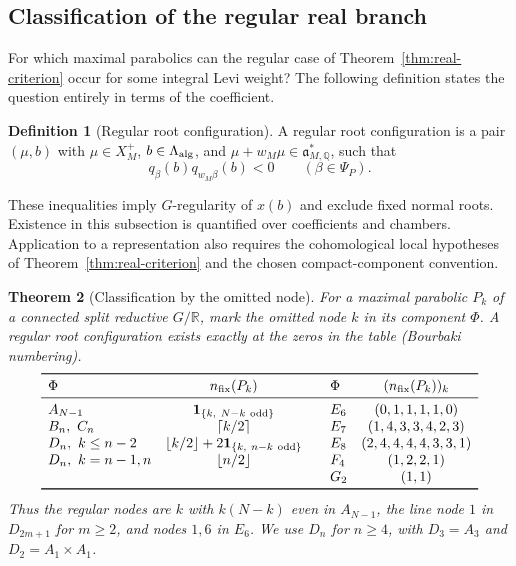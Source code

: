 \documentclass[12pt]{amsart}
\numberwithin{equation}{section}
\theoremstyle{plain}
\newtheorem{theorem}{Theorem}[section]
\theoremstyle{definition}
\newtheorem{definition}[theorem]{Definition}
\theoremstyle{remark}
\newcommand{\R}{\mathbb R}
\begin{document}
\subsection{Classification of the regular real branch} \label{sec:realclass-classification}
For which maximal parabolics can the regular case of Theorem~\ref{thm:real-criterion} occur for some integral Levi weight? The following definition states the question entirely in terms of the coefficient.
\begin{definition}[Regular root configuration] \label{def:regular-root-configuration}
A regular root configuration is a pair $(\mu,b)$ with $\mu\in X_M^+$, $b\in\Lambda_{\rm alg}$, and
$\mu+w_M\mu\in\mathfrak a_{M,\mathbb Q}^*$, such that 
\[
 q_\beta(b)q_{w_M\beta}(b)<0
 \qquad(\beta\in\Psi_P).
\]
\end{definition}
These inequalities imply $G$-regularity of $x(b)$ and exclude fixed normal roots. Existence in this subsection is quantified over coefficients and chambers. Application to a representation also requires the cohomological local hypotheses of Theorem~\ref{thm:real-criterion} and the chosen compact-component convention. 

\begin{theorem}[Classification by the omitted node] \label{thm:realclass-classification}
For a maximal parabolic $P_k$ of a connected split reductive $G/\R$, mark the omitted node $k$ in its component $\Phi$. A regular root configuration exists exactly at the zeros in the table (Bourbaki numbering). 
\[
\begin{array}{lc@{\qquad}lc}
\toprule
 \Phi & n_{\rm fix}(P_k) & \Phi & (n_{\rm fix}(P_k))_k\\
\midrule
 A_{N-1} & \mathbf1_{\{k,\ N-k\ {\rm odd}\}}
      & E_6 & (0,1,1,1,1,0)\\
 B_n,\ C_n & \lceil k/2\rceil
      & E_7 & (1,4,3,3,4,2,3)\\
 D_n,\ k\le n-2 & \lfloor k/2\rfloor+2\mathbf1_{\{k,\ n-k\ {\rm odd}\}}
      & E_8 & (2,4,4,4,4,3,3,1)\\
 D_n,\ k=n-1,n & \lfloor n/2\rfloor & F_4 & (1,2,2,1)\\
 &&G_2 &(1,1)\\
\bottomrule
\end{array}
\]
Thus the regular nodes are $k$ with $k(N-k)$ even in $A_{N-1}$, the line node $1$ in $D_{2m+1}$ for $m\ge2$, and nodes $1,6$ in $E_6$. We use $D_n$ for $n\ge4$, with $D_3=A_3$ and $D_2=A_1\times A_1$. \end{theorem}
\end{document}
